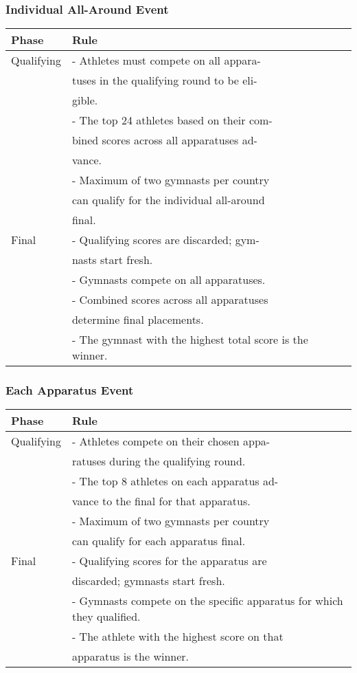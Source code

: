 \documentclass{article}
\theoremstyle{roman}
\begin{document}
\subsubsection{Individual All-Around Event}
\begin{center}
\begin{tabular}{|l|l|}
\hline
Phase & Rule \\
\hline
Qualifying & - Athletes must compete on all appara- \\
 & tuses in the qualifying round to be eli- \\
 & gible. \\
 & - The top 24 athletes based on their com- \\
 & bined scores across all apparatuses ad- \\
 & vance. \\
 & - Maximum of two gymnasts per country \\
 & can qualify for the individual all-around \\
 & final. \\
\hline
Final & - Qualifying scores are discarded; gym- \\
 & nasts start fresh. \\
 & - Gymnasts compete on all apparatuses. \\
 & - Combined scores across all apparatuses \\
 & determine final placements. \\
 & - The gymnast with the highest total score
is the winner. \\\hline
\end{tabular}
\end{center}


\subsubsection{Each Apparatus Event}
\begin{center}
\begin{tabular}{|l|l|}
\hline
Phase & Rule \\
\hline
Qualifying & - Athletes compete on their chosen appa- \\
 & ratuses during the qualifying round. \\
 & - The top 8 athletes on each apparatus ad- \\
 & vance to the final for that apparatus. \\
 & - Maximum of two gymnasts per country \\
 & can qualify for each apparatus final. \\
\hline
Final & - Qualifying scores for the apparatus are \\
 & discarded; gymnasts start fresh. \\
 & - Gymnasts compete on the specific apparatus for which they qualified. \\
 & - The athlete with the highest score on that \\
 & apparatus is the winner. \\
\hline
\end{tabular}
\end{center}
\end{document}
